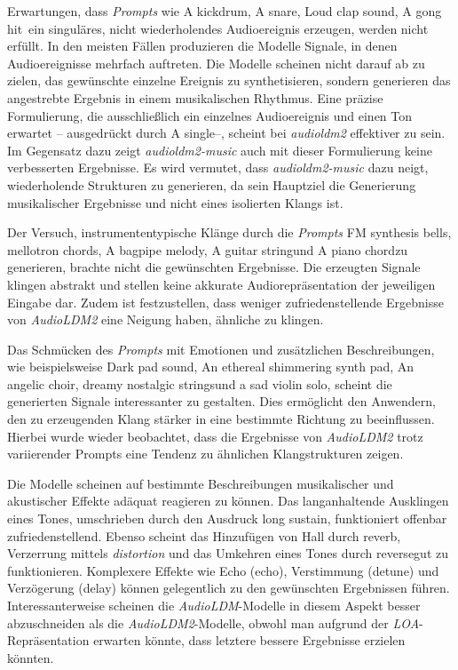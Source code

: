 \documentclass[
  a4paper,  %
  twoside,  %
  bibliography=totoc,
  headsepline,
  cleardoublepage=empty,
  parskip=half,
  draft=false
]{scrbook}
\begin{document}
Erwartungen, dass \emph{Prompts} wie \glqq A kickdrum\grqq, \glqq A snare\grqq, \glqq Loud clap sound\grqq, \glqq A gong hit\grqq \, ein singuläres, nicht wiederholendes Audioereignis erzeugen, werden nicht erfüllt. In den meisten Fällen produzieren die Modelle Signale, in denen Audioereignisse mehrfach auftreten. Die Modelle scheinen nicht darauf ab zu zielen, das gewünschte einzelne Ereignis zu synthetisieren, sondern generieren das angestrebte Ergebnis in einem musikalischen Rhythmus. Eine präzise Formulierung, die ausschließlich ein einzelnes Audioereignis und einen Ton erwartet – ausgedrückt durch \glqq A single\grqq –, scheint bei \emph{audioldm2} \cite{noauthor_cvsspaudioldm2_nodate} effektiver zu sein. Im Gegensatz dazu zeigt \emph{audioldm2-music} \cite{noauthor_cvsspaudioldm2-music_nodate} auch mit dieser Formulierung keine verbesserten Ergebnisse. Es wird vermutet, dass \emph{audioldm2-music} \cite{noauthor_cvsspaudioldm2-music_nodate} dazu neigt, wiederholende Strukturen zu generieren, da sein Hauptziel die Generierung musikalischer Ergebnisse und nicht eines isolierten Klangs ist.

Der Versuch, instrumententypische Klänge durch die \emph{Prompts} \glqq FM synthesis bells\grqq, \glqq mellotron chords\grqq, \glqq A bagpipe melody\grqq, \glqq A guitar string\grqq und \glqq A piano chord\grqq zu generieren, brachte nicht die gewünschten Ergebnisse. Die erzeugten Signale klingen abstrakt und stellen keine akkurate Audiorepräsentation der jeweiligen Eingabe dar. Zudem ist festzustellen, dass weniger zufriedenstellende Ergebnisse von \emph{AudioLDM2} eine Neigung haben, ähnliche zu klingen.

Das Schmücken des \emph{Prompts} mit Emotionen und zusätzlichen Beschreibungen, wie beispielsweise \glqq Dark pad sound\grqq, \glqq An ethereal shimmering synth pad\grqq, \glqq An angelic choir\grqq, \glqq dreamy nostalgic strings\grqq und \glqq a sad violin solo\grqq, scheint die generierten Signale interessanter zu gestalten. Dies ermöglicht den Anwendern, den zu erzeugenden Klang stärker in eine bestimmte Richtung zu beeinflussen. Hierbei wurde wieder beobachtet, dass die Ergebnisse von \emph{AudioLDM2} trotz variierender Prompts eine Tendenz zu ähnlichen Klangstrukturen zeigen.

Die Modelle scheinen auf bestimmte Beschreibungen musikalischer und akustischer Effekte adäquat reagieren zu können. Das langanhaltende Ausklingen eines Tones, umschrieben durch den Ausdruck \glqq long sustain\grqq, funktioniert offenbar zufriedenstellend. Ebenso scheint das Hinzufügen von Hall durch \glqq reverb\grqq, Verzerrung mittels \emph{distortion} und das Umkehren eines Tones durch \glqq reverse\grqq gut zu funktionieren. Komplexere Effekte wie Echo (\glqq echo\grqq), Verstimmung (\glqq detune\grqq) und Verzögerung (\glqq delay\grqq) können gelegentlich zu den gewünschten Ergebnissen führen. Interessanterweise scheinen die \emph{AudioLDM}-Modelle in diesem Aspekt besser abzuschneiden als die \emph{AudioLDM2}-Modelle, obwohl man aufgrund der \emph{LOA}-Repräsentation erwarten könnte, dass letztere bessere Ergebnisse erzielen könnten.
\end{document}
